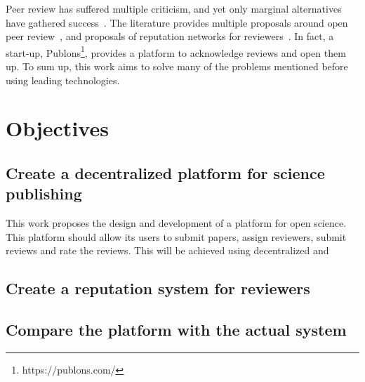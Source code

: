 Peer review has suffered multiple criticism, and yet only marginal alternatives
have gathered success~\cite{ware2008peer}. The literature provides multiple
proposals around open peer review~\cite{ford2013defining}, and proposals of
reputation networks for reviewers~\cite{frishauf2009reputation}. In fact, a
start-up, Publons\footnote{https://publons.com/}, provides a platform to
acknowledge reviews and open them up. To sum up, this work aims to solve many of
the problems mentioned before using leading technologies.

\section{Objectives}

\subsection*{Create a decentralized platform for science publishing}

This work proposes the design and development of a platform for open science.
This platform should allow its users to submit papers, assign reviewers, submit
reviews and rate the reviews. This will be achieved using decentralized and 

\subsection*{Create a reputation system for reviewers}

\subsection*{Compare the platform with the actual system}

